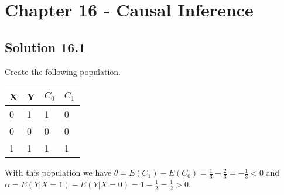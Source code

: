 \section*{Chapter 16 - Causal Inference}

\subsection*{Solution 16.1}

Create the following population.

\begin{table}[H]
\begin{tabular}{l|l||l|l}
X & Y & $C_0$ & $C_1$ \\ \hline \hline
0 & 1 & 1    & 0    \\ \hline
0 & 0 & 0    & 0    \\ \hline
1 & 1 & 1    & 1
\end{tabular}
\end{table}

With this population we have $\theta = E(C_1) - E(C_0) = \frac{1}{3} - \frac{2}{3} = -\frac{1}{3} < 0$ and $\alpha = E(Y|X=1) - E(Y|X=0) = 1 - \frac{1}{2} = \frac{1}{2} > 0$.
